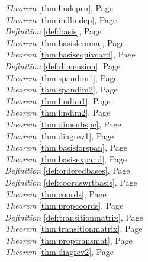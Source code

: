 \begin{multicols}{3}
\begin{center}
      \textit{Theorem} \ref{thm:lindeprn}, Page \pageref{thm:lindeprn} \\
      \textit{Theorem} \ref{thm:indlindep}, Page \pageref{thm:indlindep} \\
      \textit{Definition} \ref{def:basis}, Page \pageref{def:basis} \\
      \textit{Theorem} \ref{thm:basislemma}, Page \pageref{thm:basislemma} \\
      \textit{Theorem} \ref{thm:basisequivcard}, Page \pageref{thm:basisequivcard} \\
      \textit{Definition} \ref{def:dimension}, Page \pageref{def:dimension} \\
      \textit{Theorem} \ref{thm:spandim1}, Page \pageref{thm:spandim1} \\
      \textit{Theorem} \ref{thm:spandim2}, Page \pageref{thm:spandim2} \\
      \textit{Theorem} \ref{thm:lindim1}, Page \pageref{thm:lindim1} \\
      \textit{Theorem} \ref{thm:lindim2}, Page \pageref{thm:lindim2} \\
      \textit{Theorem} \ref{thm:dimsubspc}, Page \pageref{thm:dimsubspc} \\
      \textit{Theorem} \ref{thm:diagrev1}, Page \pageref{thm:diagrev1} \\
      \textit{Theorem} \ref{thm:basisforspan}, Page \pageref{thm:basisforspan} \\
      \textit{Theorem} \ref{thm:basisexpand}, Page \pageref{thm:basisexpand} \\
      \textit{Definition} \ref{def:orderedbases}, Page \pageref{def:orderedbases} \\
      \textit{Definition} \ref{def:coordswrtbasis}, Page \pageref{def:coordswrtbasis} \\
      \textit{Theorem} \ref{thm:coords}, Page \pageref{thm:coords} \\
      \textit{Theorem} \ref{thm:propcoords}, Page \pageref{thm:propcoords} \\
      \textit{Definition} \ref{def:transitionmatrix}, Page \pageref{def:transitionmatrix} \\
      \textit{Theorem} \ref{thm:transitionmatrix}, Page \pageref{thm:transitionmatrix} \\
      \textit{Theorem} \ref{thm:proptransmat}, Page \pageref{thm:proptransmat} \\
      \textit{Theorem} \ref{thm:diagrev2}, Page \pageref{thm:diagrev2} \\

\end{center}
\end{multicols}
